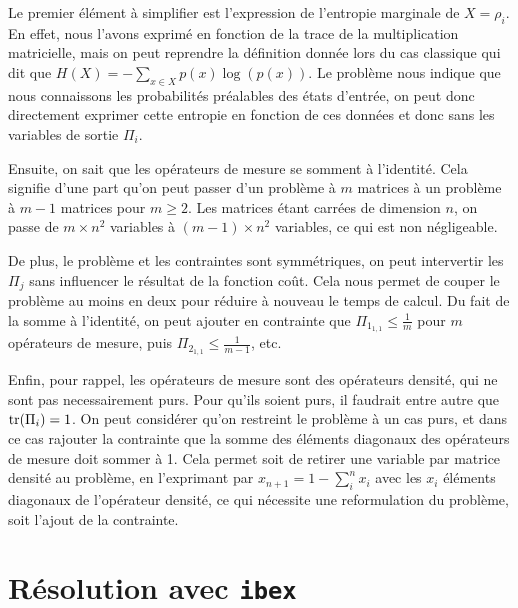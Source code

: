 Le premier élément à simplifier est l'expression de l'entropie marginale de $X=\rho_i$. En effet, nous l'avons exprimé en fonction de la trace de la multiplication matricielle, mais on peut reprendre la définition donnée lors du cas classique qui dit que $ H(X) = -\displaystyle \sum_{x \in X} p(x) \log(p(x))$. Le problème nous indique que nous connaissons les probabilités préalables des états d'entrée, on peut donc directement exprimer cette entropie en fonction de ces données et donc sans les variables de sortie $\Pi_i$.

Ensuite, on sait que les opérateurs de mesure se somment à l'identité. Cela signifie d'une part qu'on peut passer d'un problème à $m$ matrices à un problème à $m-1$ matrices pour $m \geq 2$. Les matrices étant carrées de dimension $n$, on passe de $m \times n^2$ variables à $(m - 1) \times n^2$ variables, ce qui est non négligeable.

De plus, le problème et les contraintes sont symmétriques, on peut intervertir les $\Pi_j$ sans influencer le résultat de la fonction coût. Cela nous permet de couper le problème au moins en deux pour réduire à nouveau le temps de calcul. Du fait de la somme à l'identité, on peut ajouter en contrainte que $\Pi_{1_{1, 1}} \leq \frac{1}{m}$ pour $m$ opérateurs de mesure, puis $\Pi_{2_{1, 1}} \leq \frac{1}{m-1}$, etc.

Enfin, pour rappel, les opérateurs de mesure sont des opérateurs densité, qui ne sont pas necessairement purs. Pour qu'ils soient purs, il faudrait entre autre que $\operatorname{tr}(\Pi_i) = 1$. On peut considérer qu'on restreint le problème à un cas purs, et dans ce cas rajouter la contrainte que la somme des éléments diagonaux des opérateurs de mesure doit sommer à 1. Cela permet soit de retirer une variable par matrice densité au problème, en l'exprimant par $x_{n+1} = 1 - \displaystyle \sum_{i}^{n} x_i$ avec les $x_i$ éléments diagonaux de l'opérateur densité, ce qui nécessite une reformulation du problème, soit l'ajout de la contrainte.

\medbreak

\section{Résolution avec \texttt{ibex}}


